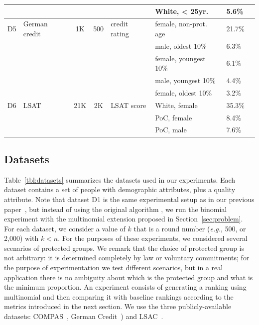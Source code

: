 \begin{table}[t]
{\begin{tabular}{clcclllc}
			& & & & & White, < 25yr. & 5.6\% \\
			\midrule
			D5 & German credit \cite{lichman_2013_uci} & 1K & 500 & credit rating & female, non-prot. age & 21.7\% \\
			& & & & & male, oldest 10\% & 6.3\% \\
			& & & & & female, youngest 10\% & 6.1\% \\
			& & & & & male, youngest 10\% & 4.4\% \\
			& & & & & female, oldest 10\% & 3.2\% \\
			\midrule
			D6 & LSAT \cite{wightman1998lsac}  & 21K & 2K  & LSAT score  & White, female & 35.3\%  \\ 
			& & & & & PoC, female & 8.4\% \\
			& & & & & PoC, male & 7.6\% \\
			\bottomrule
		\end{tabular}
	}
	\vspace{-3mm}
\end{table}

\subsection{Datasets}\label{sec:experiments-datasets}

Table~\ref{tbl:datasets} summarizes the datasets used in our experiments.
%
Each dataset contains a set of people with demographic attributes, plus a quality attribute.
%
Note that dataset D1 is the same experimental setup as in our previous paper~\cite{zehlike2017fair}, but instead of using the original algorithm \algoFAIR, we run the binomial experiment with the multinomial extension proposed in Section~\ref{sec:problem}.
%
For each dataset, we consider a value of $k$ that is a round number ({\em e.g.}, 500, or 2,000) with $k<n$.
%
For the purposes of these experiments, we considered several scenarios of protected groups.
%
We remark that the choice of protected group is not arbitrary: it is determined completely by law or voluntary commitments; for the purpose of experimentation we test different scenarios, but in a real application there is no ambiguity about which is the protected group and what is the minimum proportion.
%
An experiment consists of generating a ranking using multinomial \algoFAIR and then comparing it with baseline rankings according to the metrics introduced in the next section.
%
We use the three publicly-available datasets: COMPAS~\cite{angwin_2016_machine}, German Credit~\cite{lichman_2013_uci}) and LSAC~\cite{wightman1998lsac}.

